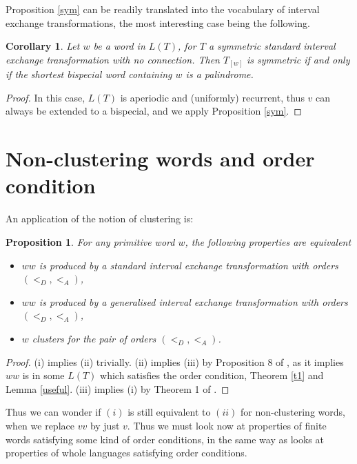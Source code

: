 \documentclass[12pt,a4paper]{amsart}
\newtheorem{corollary}[theorem]{Corollary}
\newtheorem{proposition}[theorem]{Proposition}
\begin{document}
 Proposition \ref{sym} can be readily  translated into the vocabulary of   interval exchange transformations, the most interesting case being the following.

\begin{corollary}\label{cosym}
Let $w$ be a word in $L(T)$, for $T$ a  symmetric standard interval exchange transformation with no connection. Then $T_{[w]}$ is symmetric if  and only if the shortest bispecial word containing $w$ is a palindrome.
 \end{corollary}
\begin{proof}
In this case, $L(T)$ is aperiodic and (uniformly) recurrent, thus $v$ can always be extended to a bispecial, and we apply Proposition \ref{sym}. \end{proof}



\section{Non-clustering words and order condition}
 An  application of the notion of clustering is:
 
 \begin{proposition} For any primitive word $w$,  the following properties are equivalent 
 \begin{itemize}
  \item[(i)] $ww$ is produced by
a standard  interval exchange transformation with orders   $(<_D,<_A)$,
   \item[(ii)] $ww$ is produced by 
a generalised  interval exchange transformation with orders   $(<_D,<_A)$,
 \item[(iii)] $w$ clusters for the pair of  orders   $(<_D,<_A)$.
 \end{itemize}
\end{proposition}
\begin{proof} (i) implies (ii) trivially. (ii) implies (iii) by Proposition 8 of \cite{fhuz}, as it  implies  $ww$ is in some $L(T)$ which satisfies the order condition, Theorem \ref{t1} and Lemma \ref{useful}. (iii) implies (i) by Theorem 1 of \cite{fz4}.\end{proof}

Thus we can wonder if $(i)$ is still equivalent to $(ii)$  for non-clustering words, when we replace $vv$  by just $v$. Thus we must look now at properties of finite words satisfying some kind of order conditions, in the same way  as \cite{fhuz}  looks at properties of whole languages satisfying order conditions.
 
\end{document}
